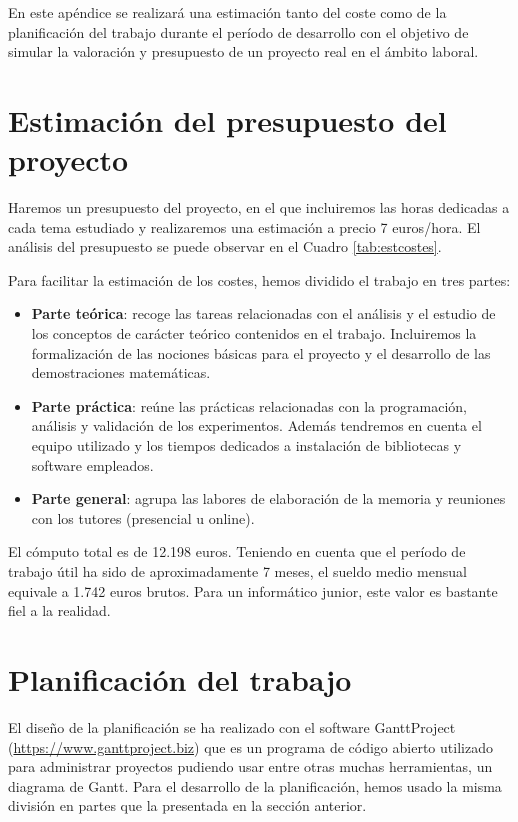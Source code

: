 En este apéndice se realizará una estimación tanto del coste como de la planificación del trabajo durante el período de desarrollo con el objetivo de simular la valoración y presupuesto de un proyecto real en el ámbito laboral.

\section{Estimación del presupuesto del proyecto}

Haremos un presupuesto del proyecto, en el que incluiremos las horas dedicadas a cada tema estudiado y realizaremos una estimación a precio 7 euros/hora. El análisis del presupuesto se puede observar en el Cuadro \ref{tab:estcostes}.

Para facilitar la estimación de los costes, hemos dividido el trabajo en tres partes:

\begin{itemize}
    \item \textbf{Parte teórica}: recoge las tareas relacionadas con el análisis y el estudio de los conceptos de carácter teórico contenidos en el trabajo. Incluiremos la formalización de las nociones básicas para el proyecto y el desarrollo de las demostraciones matemáticas.
    \item \textbf{Parte práctica}: reúne las prácticas relacionadas con la programación, análisis y validación de los experimentos. Además tendremos en cuenta el equipo utilizado y los tiempos dedicados a instalación de bibliotecas y software empleados.
    \item \textbf{Parte general}: agrupa las labores de elaboración de la memoria y reuniones con los tutores (presencial u online).
\end{itemize}

El cómputo total es de 12.198 euros. Teniendo en cuenta que el período de trabajo útil ha sido de aproximadamente 7 meses, el sueldo medio mensual equivale a 1.742 euros brutos. Para un informático junior, este valor es bastante fiel a la realidad.

\section{Planificación del trabajo}

El diseño de la planificación se ha realizado con el software GanttProject (\url{https://www.ganttproject.biz}) que es un programa de código abierto utilizado para administrar proyectos pudiendo usar entre otras muchas herramientas, un diagrama de Gantt. Para el desarrollo de la planificación, hemos usado la misma división en partes que la presentada en la sección anterior.

